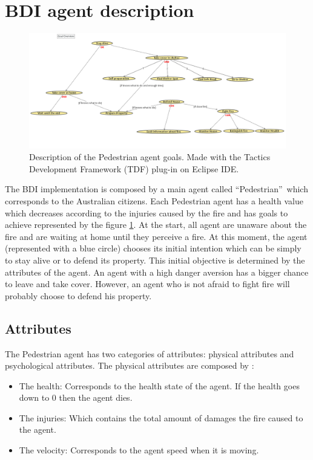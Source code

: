 \documentclass[12pt, a4paper]{memoir} %
\begin{document}
	\section{BDI agent description}

		\begin{figure}
			\includegraphics[scale=0.4]{goal-overview.png}
			\caption{\label{fig:goal-overview} Description of the Pedestrian agent goals. Made with the Tactics Development Framework (TDF) plug-in on Eclipse IDE. \cite{tdfwebsite, evertsz2015}}
	  \end{figure}

		The BDI implementation is composed by a main agent called \textquotedblleft Pedestrian\textquotedblright~which corresponds to the Australian citizens.
		Each Pedestrian agent has a health value which decreases according to the injuries caused by the fire and has goals to achieve represented by the figure \ref{fig:goal-overview}.
		At the start, all agent are unaware about the fire and are waiting at home until they perceive a fire.
		At this moment, the agent (represented with a blue circle) chooses its initial intention which can be simply to stay alive or to defend its property.
		This initial objective is determined by the attributes of the agent.
		An agent with a high danger aversion has a bigger chance to leave and take cover.
		However, an agent who is not afraid to fight fire will probably choose to defend his property.

		\subsection{Attributes}

			The Pedestrian agent has two categories of attributes: physical attributes and psychological attributes.
			\newline
			The physical attributes are composed by :
			\begin{itemize}
				\item The health: Corresponds to the health state of the agent. If the health goes down to 0 then the agent dies.
				\item The injuries: Which contains the total amount of damages the fire caused to the agent.
				\item The velocity: Corresponds to the agent speed when it is moving.
			\end{itemize}
\end{document}
